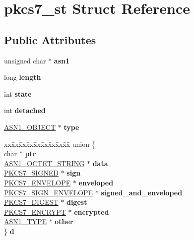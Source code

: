 \hypertarget{structpkcs7__st}{}\section{pkcs7\+\_\+st Struct Reference}
\label{structpkcs7__st}
\subsection*{Public Attributes}
\begin{DoxyCompactItemize}
\item 
\mbox{\label{structpkcs7__st_ab1fc765421d37e4483b30cf1f12123d5}} 
unsigned char $\ast$ {\bfseries asn1}
\item 
\mbox{\label{structpkcs7__st_a565b91c0f8c20b54770879e006bd41ee}} 
long {\bfseries length}
\item 
\mbox{\label{structpkcs7__st_a347c4591ec3bcf75f4dd86b430b20426}} 
int {\bfseries state}
\item 
\mbox{\label{structpkcs7__st_aaefed5b8e3dc5995f7fb1e1a300b7668}} 
int {\bfseries detached}
\item 
\mbox{\label{structpkcs7__st_acd92bf461725525e7785077578ccf226}} 
\hyperlink{structasn1__object__st}{A\+S\+N1\+\_\+\+O\+B\+J\+E\+CT} $\ast$ {\bfseries type}
\item 
\mbox{\label{structpkcs7__st_aa80ca3ef0018ef431f7a0e069ca82b83}} 
\begin{tabbing}
xx\=xx\=xx\=xx\=xx\=xx\=xx\=xx\=xx\=\kill
union \{\\
\>char $\ast$ {\bfseries ptr}\\
\>\hyperlink{structasn1__string__st}{ASN1\_OCTET\_STRING} $\ast$ {\bfseries data}\\
\>\hyperlink{structpkcs7__signed__st}{PKCS7\_SIGNED} $\ast$ {\bfseries sign}\\
\>\hyperlink{structpkcs7__enveloped__st}{PKCS7\_ENVELOPE} $\ast$ {\bfseries enveloped}\\
\>\hyperlink{structpkcs7__signedandenveloped__st}{PKCS7\_SIGN\_ENVELOPE} $\ast$ {\bfseries signed\_and\_enveloped}\\
\>\hyperlink{structpkcs7__digest__st}{PKCS7\_DIGEST} $\ast$ {\bfseries digest}\\
\>\hyperlink{structpkcs7__encrypted__st}{PKCS7\_ENCRYPT} $\ast$ {\bfseries encrypted}\\
\>\hyperlink{structasn1__type__st}{ASN1\_TYPE} $\ast$ {\bfseries other}\\
\} {\bfseries d}\\

\end{tabbing}\end{DoxyCompactItemize}


